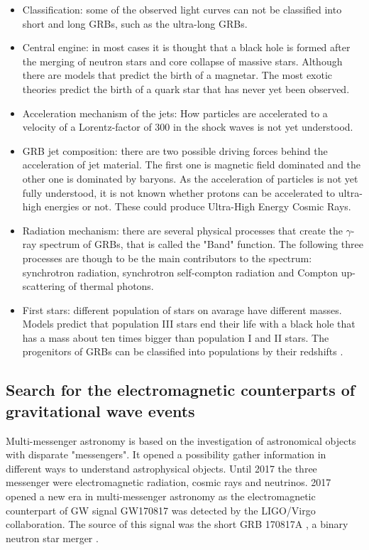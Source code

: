 \documentclass[12pt, a4paper,titlepage]{article}
\numberwithin{equation}{section}
\numberwithin{figure}{section}
\begin{document}
\begin{itemize}
\item{Classification: some of the observed light curves can not be classified into short and long GRBs, such as the ultra-long GRBs.}
\item{Central engine: in most cases it is thought that a black hole is formed after the merging of neutron stars and core collapse of massive stars. Although there are models that predict the birth of a magnetar. The most exotic theories predict the birth of a quark star that has never yet been observed.}
\item{Acceleration mechanism of the jets: How particles are accelerated to a velocity of a Lorentz-factor of 300 in the shock waves is not yet understood.}
\item{GRB jet composition: there are two possible driving forces behind the acceleration of jet material. The first one is magnetic field dominated and the other one is dominated by baryons. As the acceleration of particles is not yet fully understood, it is not known whether protons can be accelerated to ultra-high energies or not. These could produce Ultra-High Energy Cosmic Rays.} 
\item{Radiation mechanism: there are several physical processes that create the $\gamma$-ray spectrum of GRBs, that is called  the "Band" function. The following three processes are though to be the main contributors to the spectrum: synchrotron radiation, synchrotron self-compton radiation and Compton up-scattering of thermal photons.}
\item{First stars: different population of stars on avarage have different masses. Models predict that population III stars end their life with a black hole that has a mass about ten times bigger than population I and II stars. The progenitors of GRBs can be classified into populations by their redshifts \cite{grb20}.}

\end{itemize}

\subsection{Search for the electromagnetic counterparts of gravitational wave events}

Multi-messenger astronomy is based on the investigation of astronomical objects with disparate "messengers". It opened a possibility gather information in different ways to understand astrophysical objects. Until 2017 the three messenger were electromagnetic radiation, cosmic rays and neutrinos. 2017 opened a new era in multi-messenger astronomy as the electromagnetic counterpart of GW signal GW170817 was detected by the LIGO/Virgo collaboration. The source of this signal was the short GRB 170817A \cite{grb21}, a binary neutron star merger \cite{grb17}. 
\end{document}
